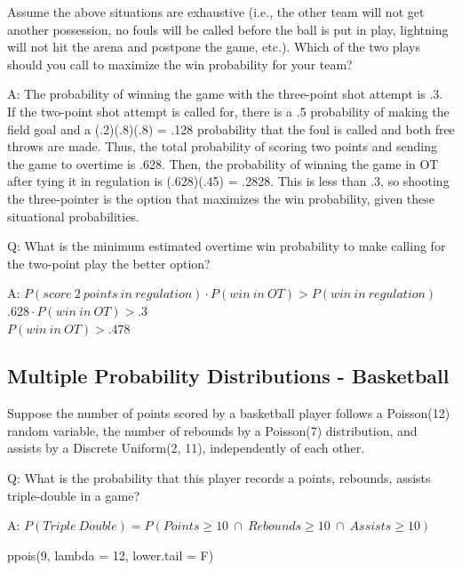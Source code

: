 \documentclass[
  11pt,
]{book}
\newenvironment{Shaded}{\begin{snugshade}}{\end{snugshade}}
\newcommand{\AttributeTok}[1]{\textcolor[rgb]{0.77,0.63,0.00}{#1}}
\newcommand{\DecValTok}[1]{\textcolor[rgb]{0.00,0.00,0.81}{#1}}
\newcommand{\FunctionTok}[1]{\textcolor[rgb]{0.00,0.00,0.00}{#1}}
\newcommand{\NormalTok}[1]{#1}
\theoremstyle{definition}
\theoremstyle{definition}
\theoremstyle{definition}
\theoremstyle{definition}
\theoremstyle{remark}
\begin{document}
Assume the above situations are exhaustive (i.e., the other team will not get another possession, no fouls will be called before the ball is put in play, lightning will not hit the arena and postpone the game, etc.). Which of the two plays should you call to maximize the win probability for your team?

A: The probability of winning the game with the three-point shot attempt is .3. If the two-point shot attempt is called for, there is a .5 probability of making the field goal and a (.2)(.8)(.8) = .128 probability that the foul is called and both free throws are made. Thus, the total probability of scoring two points and sending the game to overtime is .628. Then, the probability of winning the game in OT after tying it in regulation is (.628)(.45) = .2828. This is less than .3, so shooting the three-pointer is the option that maximizes the win probability, given these situational probabilities.

Q: What is the minimum estimated overtime win probability to make calling for the two-point play the better option?

A: \(P(score\ 2\ points\ in\ regulation) \cdot P(win\ in\ OT) > P(win\ in\ regulation)\)\\
\(.628 \cdot P(win\ in\ OT) > .3\)\\
\(P(win\ in\ OT) > .478\)

\hypertarget{multiple-probability-distributions---basketball}{%
\subsection{Multiple Probability Distributions - Basketball}\label{multiple-probability-distributions---basketball}}

Suppose the number of points scored by a basketball player follows a Poisson(12) random variable, the number of rebounds by a Poisson(7) distribution, and assists by a Discrete Uniform(2, 11), independently of each other.

Q: What is the probability that this player records a points, rebounds, assists triple-double in a game?

A: \(P(Triple\ Double) = P(Points \geq 10\ \cap\ Rebounds \geq 10\ \cap\ Assists \geq 10)\)

\begin{Shaded}
\begin{Highlighting}[]
\FunctionTok{ppois}\NormalTok{(}\DecValTok{9}\NormalTok{, }\AttributeTok{lambda =} \DecValTok{12}\NormalTok{, }\AttributeTok{lower.tail =}\NormalTok{ F)}
\end{Highlighting}
\end{Shaded}
\end{document}
